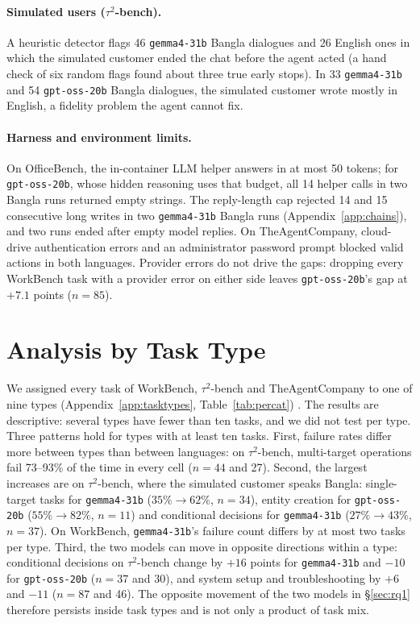 \documentclass[11pt]{article}
\newif\ifshowverify
\newcommand{\verify}[1]{\ifshowverify{\color{red}\,[VERIFY: #1]}\fi}
\newcommand{\gemma}{\texttt{gemma4-31b}}
\newcommand{\gptoss}{\texttt{gpt-oss-20b}}
\newcommand{\OB}{OfficeBench}
\newcommand{\WB}{WorkBench}
\newcommand{\TAU}{$\tau^2$-bench}
\newcommand{\TAC}{TheAgentCompany}
\begin{document}
\paragraph{Simulated users (\TAU{}).} A heuristic detector flags 46 \gemma{} Bangla dialogues and
26 English ones in which the simulated customer ended the chat before the agent acted (a hand check
of six random flags found about three true early stops). In 33 \gemma{} and 54 \gptoss{} Bangla
dialogues, the simulated customer wrote mostly in English, a fidelity problem the agent cannot fix.

\paragraph{Harness and environment limits.} On \OB{}, the in-container LLM helper answers in at most
50 tokens; for \gptoss{}, whose hidden reasoning uses that budget, all 14 helper calls in two Bangla
runs returned empty strings. The reply-length cap rejected 14 and 15 consecutive long writes in two
\gemma{} Bangla runs (Appendix~\ref{app:chains}), and two runs ended after empty model replies. On
\TAC{}, cloud-drive authentication errors and an administrator password prompt blocked valid actions
in both languages. Provider errors do not drive the gaps: dropping every \WB{} task with a
provider error on either side leaves \gptoss{}'s gap at $+7.1$ points ($n=85$).

\section{Analysis by Task Type}
\label{sec:tasktypes}

We assigned every task of \WB{}, \TAU{} and \TAC{} to one of nine types (Appendix~\ref{app:tasktypes},
Table~\ref{tab:percat}) \verify{who assigned types and how}. The results are descriptive: several
types have fewer than ten tasks, and we did not test per type. Three patterns hold for types with
at least ten tasks. First, failure rates differ more between types than between languages: on
\TAU{}, multi-target operations fail 73--93\% of the time in every cell ($n=44$ and 27). Second,
the largest increases are on \TAU{}, where the simulated customer speaks Bangla: single-target
tasks for \gemma{} ($35\%\to62\%$, $n=34$), entity creation for \gptoss{} ($55\%\to82\%$, $n=11$)
and conditional decisions for \gemma{} ($27\%\to43\%$, $n=37$). On \WB{}, \gemma{}'s failure
count differs by at most two tasks per type. Third, the two models can move in opposite directions
within a type: conditional decisions on \TAU{} change by $+16$ points for \gemma{} and $-10$ for
\gptoss{} ($n=37$ and 30), and system setup and troubleshooting by $+6$ and $-11$ ($n=87$ and
46). The opposite movement of the two models in \S\ref{sec:rq1} therefore persists inside task
types and is not only a product of task mix.
\end{document}
